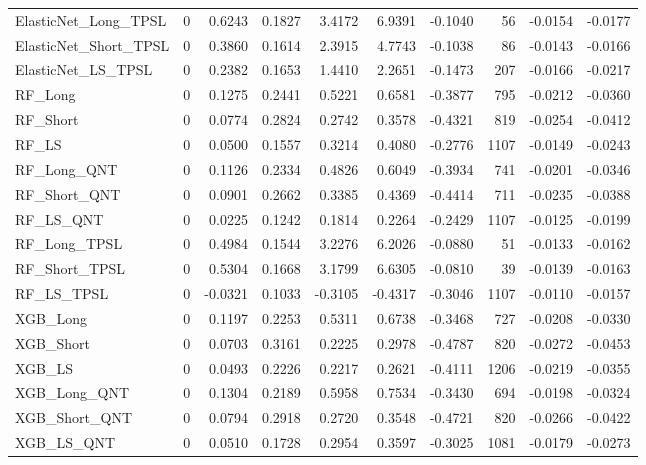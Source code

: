 \begin{tabular}{llrrrrrrrr}
\cline{1-10}
ElasticNet\_Long\_TPSL & 0 & 0.6243 & 0.1827 & 3.4172 & 6.9391 & -0.1040 & 56 & -0.0154 & -0.0177 \\
\cline{1-10}
ElasticNet\_Short\_TPSL & 0 & 0.3860 & 0.1614 & 2.3915 & 4.7743 & -0.1038 & 86 & -0.0143 & -0.0166 \\
\cline{1-10}
ElasticNet\_LS\_TPSL & 0 & 0.2382 & 0.1653 & 1.4410 & 2.2651 & -0.1473 & 207 & -0.0166 & -0.0217 \\
\cline{1-10}
RF\_Long & 0 & 0.1275 & 0.2441 & 0.5221 & 0.6581 & -0.3877 & 795 & -0.0212 & -0.0360 \\
\cline{1-10}
RF\_Short & 0 & 0.0774 & 0.2824 & 0.2742 & 0.3578 & -0.4321 & 819 & -0.0254 & -0.0412 \\
\cline{1-10}
RF\_LS & 0 & 0.0500 & 0.1557 & 0.3214 & 0.4080 & -0.2776 & 1107 & -0.0149 & -0.0243 \\
\cline{1-10}
RF\_Long\_QNT & 0 & 0.1126 & 0.2334 & 0.4826 & 0.6049 & -0.3934 & 741 & -0.0201 & -0.0346 \\
\cline{1-10}
RF\_Short\_QNT & 0 & 0.0901 & 0.2662 & 0.3385 & 0.4369 & -0.4414 & 711 & -0.0235 & -0.0388 \\
\cline{1-10}
RF\_LS\_QNT & 0 & 0.0225 & 0.1242 & 0.1814 & 0.2264 & -0.2429 & 1107 & -0.0125 & -0.0199 \\
\cline{1-10}
RF\_Long\_TPSL & 0 & 0.4984 & 0.1544 & 3.2276 & 6.2026 & -0.0880 & 51 & -0.0133 & -0.0162 \\
\cline{1-10}
RF\_Short\_TPSL & 0 & 0.5304 & 0.1668 & 3.1799 & 6.6305 & -0.0810 & 39 & -0.0139 & -0.0163 \\
\cline{1-10}
RF\_LS\_TPSL & 0 & -0.0321 & 0.1033 & -0.3105 & -0.4317 & -0.3046 & 1107 & -0.0110 & -0.0157 \\
\cline{1-10}
XGB\_Long & 0 & 0.1197 & 0.2253 & 0.5311 & 0.6738 & -0.3468 & 727 & -0.0208 & -0.0330 \\
\cline{1-10}
XGB\_Short & 0 & 0.0703 & 0.3161 & 0.2225 & 0.2978 & -0.4787 & 820 & -0.0272 & -0.0453 \\
\cline{1-10}
XGB\_LS & 0 & 0.0493 & 0.2226 & 0.2217 & 0.2621 & -0.4111 & 1206 & -0.0219 & -0.0355 \\
\cline{1-10}
XGB\_Long\_QNT & 0 & 0.1304 & 0.2189 & 0.5958 & 0.7534 & -0.3430 & 694 & -0.0198 & -0.0324 \\
\cline{1-10}
XGB\_Short\_QNT & 0 & 0.0794 & 0.2918 & 0.2720 & 0.3548 & -0.4721 & 820 & -0.0266 & -0.0422 \\
\cline{1-10}
XGB\_LS\_QNT & 0 & 0.0510 & 0.1728 & 0.2954 & 0.3597 & -0.3025 & 1081 & -0.0179 & -0.0273 \\

\end{tabular}
